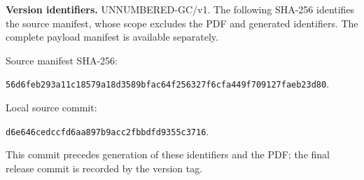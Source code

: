 \par\bigskip\begingroup\footnotesize
\noindent\textbf{Version identifiers.} UNNUMBERED-GC/v1. The following SHA-256 identifies the source manifest, whose scope excludes the PDF and generated identifiers. The complete payload manifest is available separately.\par
\noindent Source manifest SHA-256:\par\noindent\texttt{56d6feb293a11c18\allowbreak{}579a18d3589bfac6\allowbreak{}4f256327f6cfa449\allowbreak{}f709127faeb23d80}.\par
\noindent Local source commit:\par\noindent\texttt{d6e646cedccfd6aa\allowbreak{}897b9acc2fbbdfd9\allowbreak{}355c3716}.\par
This commit precedes generation of these identifiers and the PDF; the final release commit is recorded by the version tag.\par\endgroup
